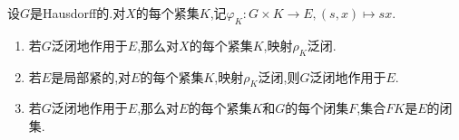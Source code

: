 \begin{proposition}{}{}
	设$G$是Hausdorff的.对$X$的每个紧集$K$,记$\varphi_{K}:G\times K\to E,\left(s,x\right)\mapsto sx$.
	\begin{enumerate}
		\item 若$G$泛闭地作用于$E$,那么对$X$的每个紧集$K$,映射$\rho_{K}$泛闭.
		\item 若$E$是局部紧的,对$E$的每个紧集$K$,映射$\rho_{K}$泛闭,则$G$泛闭地作用于$E$.
		\item 若$G$泛闭地作用于$E$,那么对$E$的每个紧集$K$和$G$的每个闭集$F$,集合$FK$是$E$的闭集.
	\end{enumerate}
\end{proposition}
